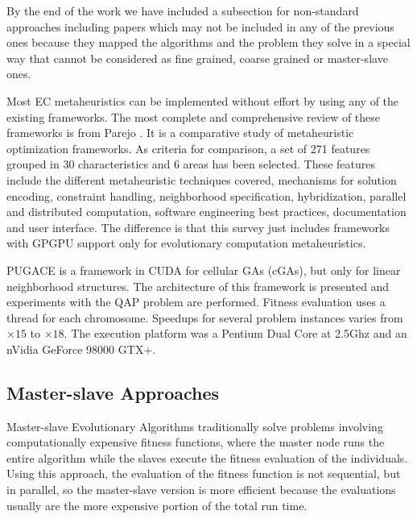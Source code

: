 \documentclass[review]{elsarticle}
\begin{document}
By the end of the work we have included a subsection for non-standard approaches \cite{DBLP:conf/gecco/PospichalMOSJ11} including  papers which may not be included in any of the previous ones because they mapped the algorithms and the problem they solve in a special way that cannot be considered as fine grained, coarse grained or master-slave ones.


Most EC metaheuristics can be implemented without effort by using any of the existing frameworks. The most complete and comprehensive review of these frameworks is from Parejo \cite{springerlink:10.1007/s00500-011-0754-8}. It is a comparative study of metaheuristic optimization frameworks. As criteria for comparison, a set of 271 features grouped in 30 characteristics and 6 areas has been selected. These features include the different metaheuristic techniques covered, mechanisms for solution encoding, constraint handling, neighborhood specification, hybridization, parallel and distributed computation, software engineering best practices, documentation and user interface. The difference is that this survey just includes frameworks with GPGPU support only for evolutionary computation metaheuristics. 


PUGACE\cite{5586286} is a framework in CUDA for cellular GAs (cGAs), but only for linear neighborhood structures. The architecture of this framework is presented and experiments with the QAP problem are performed. Fitness evaluation uses a thread for each chromosome. Speedups for several problem instances varies from $\times15$ to $\times18$. The execution platform was a Pentium Dual Core at 2.5Ghz and an nVidia GeForce 98000 GTX+.


\subsection{Master-slave Approaches}
\label{sec:masterSlave}

Master-slave Evolutionary Algorithms traditionally solve problems involving computationally expensive fitness functions, where the master node runs the entire algorithm while the slaves execute the fitness evaluation of the individuals. Using this approach, the evaluation of the fitness function is not sequential, but in parallel, so the master-slave version is more efficient because the evaluations usually are the more expensive portion of the total run time.
\end{document}
